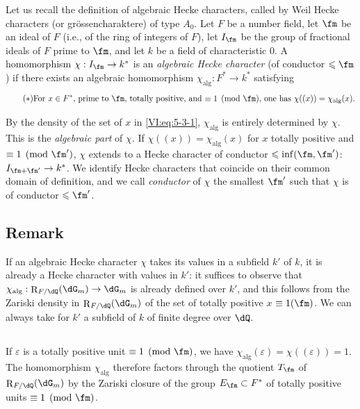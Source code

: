 \documentclass[oneside]{book}
\DeclareMathOperator{\res}{R} %
\newcounter{char}
\theoremstyle{sga-source}
\theoremstyle{sga-source-dash}
\theoremstyle{sga-source-dotdash}
\theoremstyle{sga-source-number-note-dash}
\theoremstyle{sga-source-note-number-dotdash}
\theoremstyle{sga-source-example-dotdash}
\theoremstyle{sga-source-inline-number}
\theoremstyle{sga-source-bare-number}
\theoremstyle{sga-source}
\newcommand{\PrintPage}[1]{}\newcommand{\MathPage}[1]{}\newcommand{\PrintCite}[2]{#1}\newcommand{\var}[3]{#1}
\begin{document}
Let us recall the definition of algebraic Hecke characters, called by Weil 
Hecke characters (or gr\"ossencharaktere) of type $A_0$. Let $F$ be 
a number field, let $\fm$ be an ideal of $F$ (i.e., of the ring of integers of 
$F$), let $I_\fm$ be the group of fractional ideals of $F$ prime to $\fm$, 
and let $k$ be a field of characteristic $0$. A homomorphism 
$\chi:I_\fm \to k^\ast$ is an \emph{algebraic Hecke character} (of 
conductor $\leqslant \fm$) if there exists an algebraic homomorphism 
$\chi_\text{alg}:F^\ast \to k^\ast$ satisfying 
\begin{equation*}\tag{$*$}\label{VI:eq:5-3-1}
\text{For $x\in F^\ast$, prime to $\fm$, totally positive, and 
$\equiv 1\pmod\fm$, one has $\chi((x))=\chi_\text{alg}(x)$.}
\end{equation*}

By the density of the set of $x$ in \eqref{VI:eq:5-3-1}, $\chi_\text{alg}$ 
is entirely determined by $\chi$. This is the \emph{algebraic part} 
of $\chi$. If $\chi((x))=\chi_\text{alg}(x)$ for $x$ totally positive and 
$\equiv 1\pmod{\fm'}$, $\chi$ extends to a Hecke character of 
conductor $\leqslant \inf(\fm,\fm')$: $I_{\fm+\fm'}\to k^\ast$. We 
identify Hecke characters that coincide on their common domain of 
definition, and we call \emph{conductor} of $\chi$ the smallest $\fm'$ 
such that $\chi$ is of conductor $\leqslant \fm'$. 





\PrintPage{210}
\subsection{Remark}\label{VI:5-4}

If an algebraic Hecke character $\chi$ takes its values in a 
subfield $k'$ of $k$, it is already a Hecke character with values in 
$k'$: it suffices to observe that $\chi_\text{alg}:\res_{F/\dQ}(\dG_m) \to \dG_m$ 
is already defined over $k'$, and this follows from the Zariski density 
in $\res_{F/\dQ}(\dG_m)$ of the set of totally positive $x$ 
$\equiv 1(\fm)$. We can always take for $k'$ a subfield of $k$ of 
finite degree over $\dQ$. 





\subsection{}\label{VI:5-5}

If $\varepsilon$ is a totally positive unit $\equiv 1\pmod\fm$, we have 
$\chi_\text{alg}(\varepsilon) = \chi((\varepsilon)) = 1$. The homomorphism 
$\chi_\text{alg}$ therefore factors through the quotient $T_\fm$ of 
$\res_{F/\dQ}(\dG_m)$ by the Zariski closure of the group 
$E_\fm\subset F^\ast$ of totally positive units $\equiv 1\pmod\fm$. 
\end{document}
